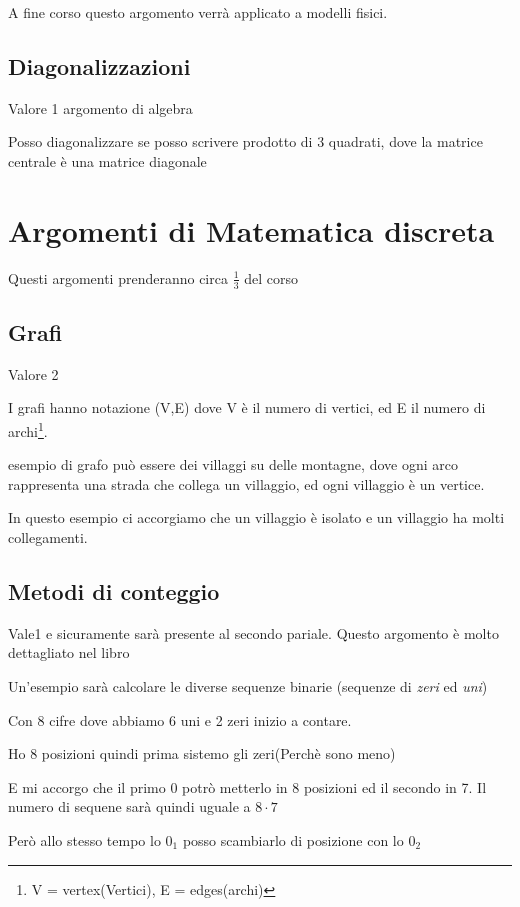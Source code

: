 A fine corso questo argomento verrà applicato a modelli fisici.

\subsection{Diagonalizzazioni}

Valore 1 argomento di algebra

Posso diagonalizzare se posso scrivere prodotto di 3 quadrati, dove la matrice centrale è una matrice diagonale

\section{Argomenti di Matematica discreta}

Questi argomenti prenderanno circa $\frac{1}{3}$ del corso
\subsection{Grafi}

Valore 2

I grafi hanno notazione (V,E) dove V è il numero di vertici, ed E il numero di archi\footnote{V = vertex(Vertici), E = edges(archi)}.

esempio di grafo può essere dei villaggi su delle montagne, dove ogni arco rappresenta una strada che collega un villaggio, ed ogni villaggio è un vertice.

In questo esempio ci accorgiamo che un villaggio è isolato e un villaggio ha molti collegamenti.

\subsection{Metodi di conteggio}

Vale1 e sicuramente sarà presente al secondo pariale.
Questo argomento è molto dettagliato nel libro

Un'esempio sarà calcolare le diverse sequenze binarie (sequenze di \textit{zeri} ed \textit{uni})

Con 8 cifre dove abbiamo 6 uni e 2 zeri inizio a contare.

Ho 8 posizioni quindi prima sistemo gli zeri(Perchè sono meno)

E mi accorgo che il primo $0$ potrò metterlo in 8 posizioni ed il secondo in 7. Il numero di sequene sarà quindi uguale a $8\cdot7$

Però allo stesso tempo lo $0_1$ posso scambiarlo di posizione con lo $0_2$

